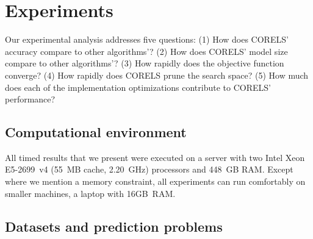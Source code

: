 \section{Experiments}
\label{sec:experiments}

Our experimental analysis addresses five questions:
(1) How does CORELS' accuracy compare to other algorithms'?
(2) How does CORELS' model size compare to other algorithms'?
(3) How rapidly does the objective function converge?
(4) How rapidly does CORELS prune the search space?
(5) How much does each of the implementation optimizations contribute to CORELS' performance?

\subsection{Computational environment}

All timed results that we present were executed on a server with two Intel Xeon E5-2699~v4
(55~MB cache, 2.20~GHz) processors and 448~GB RAM.
%
Except where we mention a memory constraint, all experiments
can run comfortably on smaller machines, \eg a laptop with 16GB~RAM.

\subsection{Datasets and prediction problems}


